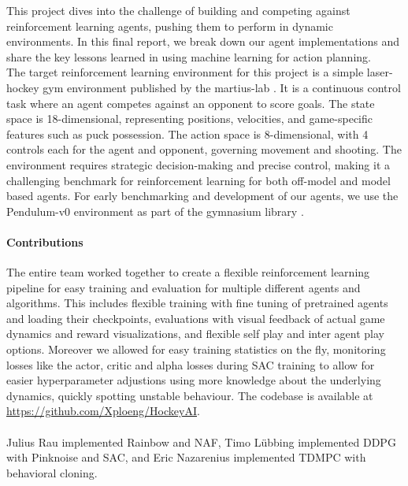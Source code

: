 This project dives into the challenge of building and competing against reinforcement learning agents, pushing them to perform in dynamic environments. In this final report, we break down our agent implementations and share the key lessons learned in using machine learning for action planning.\\
The target reinforcement learning environment for this project is a simple laser-hockey gym environment published by the martius-lab \cite{hockey_GitHub}. It is a continuous control task where an agent competes against an opponent to score goals. The state space is 18-dimensional, representing positions, velocities, and game-specific features such as puck possession. The action space is 8-dimensional, with 4 controls each for the agent and opponent, governing movement and shooting. The environment requires strategic decision-making and precise control, making it a challenging benchmark for reinforcement learning for both off-model and model based agents. For early benchmarking and development of our agents, we use the Pendulum-v0 environment as part of the gymnasium library \cite{towers2024gymnasiumstandardinterfacereinforcement}.

\paragraph{Contributions}
The entire team worked together to create a flexible reinforcement learning pipeline for easy training and evaluation for multiple different agents and algorithms. This includes flexible training with fine tuning of pretrained agents and loading their checkpoints, evaluations with visual feedback of actual game dynamics and reward visualizations, and flexible self play and inter agent play options. Moreover we allowed for easy training statistics on the fly, monitoring losses like the actor, critic and alpha losses during SAC training to allow for easier hyperparameter adjustions using more knowledge about the underlying dynamics, quickly spotting unstable behaviour. The codebase is available at \hyperlink{https://github.com/Xploeng/HockeyAI}{https://github.com/Xploeng/HockeyAI}.\\\\
Julius Rau implemented Rainbow and NAF, Timo Lübbing implemented DDPG with Pinknoise and SAC, and Eric Nazarenius implemented TDMPC with behavioral cloning.